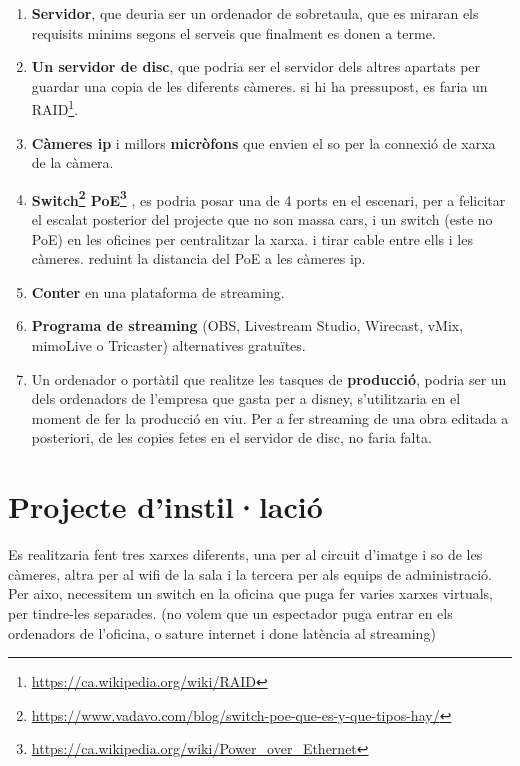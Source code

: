 \documentclass[
  10pt, krantz2,
]{krantz}
\DeclareRobustCommand{\href}[2]{#2\footnote{\url{#1}}}
\renewcommand{\href}[2]{#2\footnote{\url{#1}}}
\begin{document}
\begin{enumerate}
\def\labelenumi{\arabic{enumi}.}
\item
  \textbf{Servidor}, que deuria ser un ordenador de sobretaula, que es miraran els requisits minims segons el serveis que finalment es donen a terme.
\item
  \textbf{Un servidor de disc}, que podria ser el servidor dels altres apartats per guardar una copia de les diferents càmeres. si hi ha pressupost, es faria un \href{https://ca.wikipedia.org/wiki/RAID}{RAID}.
\item
  \textbf{Càmeres ip} i millors \textbf{micròfons} que envien el so per la connexió de xarxa de la càmera.
\item
  \textbf{\href{https://www.vadavo.com/blog/switch-poe-que-es-y-que-tipos-hay/}{Switch} \href{https://ca.wikipedia.org/wiki/Power_over_Ethernet}{PoE}} , es podria posar una de 4 ports en el escenari, per a felicitar el escalat posterior del projecte que no son massa cars, i un switch (este no PoE) en les oficines per centralitzar la xarxa. i tirar cable entre ells i les càmeres. reduint la distancia del PoE a les càmeres ip.
\item
  \textbf{Conter} en una plataforma de streaming.
\item
  \textbf{Programa de streaming} (OBS, Livestream Studio, Wirecast, vMix, mimoLive o Tricaster) alternatives gratuïtes.
\item
  Un ordenador o portàtil que realitze les tasques de \textbf{producció}, podria ser un dels ordenadors de l'empresa que gasta per a disney, s'utilitzaria en el moment de fer la producció en viu. Per a fer streaming de una obra editada a posteriori, de les copies fetes en el servidor de disc, no faria falta.
\end{enumerate}

\hypertarget{projecte-dinstillaciuxf3}{%
\section{Projecte d'instil·lació}\label{projecte-dinstillaciuxf3}}

Es realitzaria fent tres xarxes diferents, una per al circuit d'imatge i so de les càmeres, altra per al wifi de la sala i la tercera per als equips de administració. Per aixo, necessitem un switch en la oficina que puga fer varies xarxes virtuals, per tindre-les separades. (no volem que un espectador puga entrar en els ordenadors de l'oficina, o sature internet i done latència al streaming)
\end{document}
